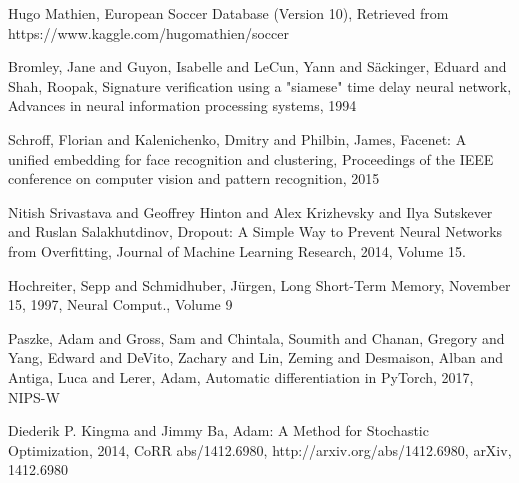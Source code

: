 \documentclass[a4paper]{article}
\begin{document}
\newpage

\begin{thebibliography}{10}
 Hugo Mathien, European Soccer Database (Version 10), Retrieved from https://www.kaggle.com/hugomathien/soccer

 Bromley, Jane and Guyon, Isabelle and LeCun, Yann and S{\"a}ckinger, Eduard and Shah, Roopak, Signature verification using a "siamese" time delay neural network, Advances in neural information processing systems, 1994

 Schroff, Florian and Kalenichenko, Dmitry and Philbin, James, Facenet: A unified embedding for face recognition and clustering, Proceedings of the IEEE conference on computer vision and pattern recognition, 2015

 Nitish Srivastava and Geoffrey Hinton and Alex Krizhevsky and Ilya Sutskever and Ruslan Salakhutdinov, Dropout: A Simple Way to Prevent Neural Networks from Overfitting, Journal of Machine Learning Research, 2014, Volume 15.

 Hochreiter, Sepp and Schmidhuber, J\"{u}rgen, Long Short-Term Memory, November 15, 1997, Neural Comput., Volume 9

 Paszke, Adam and Gross, Sam and Chintala, Soumith and Chanan, Gregory and Yang, Edward and DeVito, Zachary and Lin, Zeming and Desmaison, Alban and Antiga, Luca and Lerer, Adam, Automatic differentiation in PyTorch, 2017, NIPS-W

 Diederik P. Kingma and Jimmy Ba, Adam: {A} Method for Stochastic Optimization, 2014, CoRR abs/1412.6980, http://arxiv.org/abs/1412.6980, arXiv, 1412.6980

\end{thebibliography}
\end{document}
